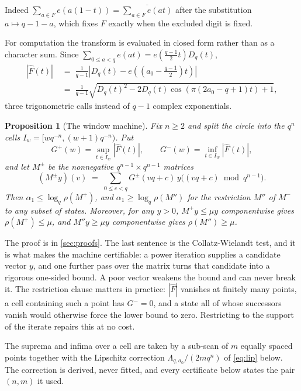 \documentclass[11pt]{amsart}
\newtheorem{proposition}[theorem]{Proposition}
\theoremstyle{definition}
\theoremstyle{remark}
\begin{document}
Indeed $\sum_{a \in F} e(a(1-t)) = \overline{\sum_{a \in F} e(at)}$ after the substitution $a \mapsto q-1-a$, which fixes $F$ exactly when the excluded digit is fixed.

For computation the transform is evaluated in closed form rather than as a character sum. Since $\sum_{0 \le a < q} e(at) = e\!\left(\tfrac{q-1}{2}t\right)D_{q}(t)$,
\begin{equation}
\label{eq:closed}
\begin{split}
  |\widehat{F}(t)| \;&=\; \frac{1}{q-1}\left|D_{q}(t) - e\!\left(\left(a_{0} - \tfrac{q-1}{2}\right)t\right)\right| \\
  \;&=\; \frac{1}{q-1}\sqrt{D_{q}(t)^{2} - 2D_{q}(t)\cos\!\left(\pi(2a_{0}-q+1)t\right) + 1},
\end{split}
\end{equation}
three trigonometric calls instead of $q-1$ complex exponentials.

\begin{proposition}[The window machine]
\label{prop:window}
Fix $n \ge 2$ and split the circle into the $q^{n}$ cells $I_{w} = [w q^{-n}, (w+1)q^{-n})$. Put
\[
  G^{+}(w) = \sup_{t \in I_{w}} |\widehat{F}(t)|, \qquad G^{-}(w) = \inf_{t \in I_{w}} |\widehat{F}(t)| ,
\]
and let $M^{\pm}$ be the nonnegative $q^{n-1} \times q^{n-1}$ matrices
\[
  (M^{\pm}y)(v) \;=\; \sum_{0 \le c < q} G^{\pm}(vq + c)\, y\big((vq+c) \bmod q^{n-1}\big).
\]
Then $\alpha_{1} \le \log_{q}\rho(M^{+})$, and $\alpha_{1} \ge \log_{q}\rho(M'')$ for the restriction $M''$ of $M^{-}$ to any subset of states. Moreover, for any $y > 0$, $M^{+}y \le \mu y$ componentwise gives $\rho(M^{+}) \le \mu$, and $M''y \ge \mu y$ componentwise gives $\rho(M'') \ge \mu$.
\end{proposition}

The proof is in \cref{sec:proofs}. The last sentence is the Collatz-Wielandt test, and it is what makes the machine certifiable: a power iteration supplies a candidate vector $y$, and one further pass over the matrix turns that candidate into a rigorous one-sided bound. A poor vector weakens the bound and can never break it. The restriction clause matters in practice: $|\widehat{F}|$ vanishes at finitely many points, a cell containing such a point has $G^{-} = 0$, and a state all of whose successors vanish would otherwise force the lower bound to zero. Restricting to the support of the iterate repairs this at no cost.

The suprema and infima over a cell are taken by a sub-scan of $m$ equally spaced points together with the Lipschitz correction $\Lambda_{q,a_{0}}/(2mq^{n})$ of \cref{eq:lip} below. The correction is derived, never fitted, and every certificate below states the pair $(n,m)$ it used.
\end{document}
